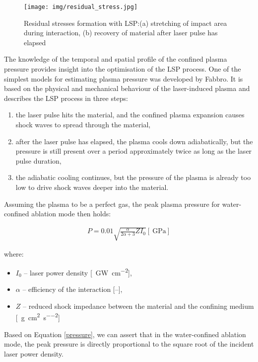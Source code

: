 \begin{figure}[h]
    \centering
    \texttt{[image: img/residual\_stress.jpg]}
    \caption{Residual stresses formation with LSP:(a) stretching of impact area during interaction, (b) recovery of material after laser pulse has elapsed \protect\cite{fabbro_peyre_berthe_scherpereel_1998}}
    \label{fig:lspresidual}
\end{figure}


The knowledge of the temporal and spatial profile of the confined plasma pressure provides insight into the optimisation of the LSP process. One of the simplest models for estimating plasma pressure was developed by Fabbro. It is based on the physical and mechanical behaviour of the laser-induced plasma and describes the LSP process in three steps:

\begin{enumerate}
    \item the laser pulse hits the material, and the confined plasma expansion causes shock waves to spread through the material,
    \item after the laser pulse has elapsed, the plasma cools down adiabatically, but the pressure is still present over a period approximately twice as long as the laser pulse duration,
    \item the adiabatic cooling continues, but the pressure of the plasma is already too low to drive shock waves deeper into the material.
\end{enumerate}

Assuming the plasma to be a perfect gas, the peak plasma pressure for water-confined ablation mode then holds:

\begin{gather} \label{pressure}
P = 0.01\sqrt{\frac{\alpha}{2\alpha + 3} Z I_{0} }  [\SI{}{\giga\pascal}] 
\end{gather} 

where:

\begin{itemize}
    \item $I_{0}$ -- laser power density [\SI{}{\giga\watt\per\cm\squared}],
    \item $\alpha$ -- efficiency of the interaction [--],
    \item $Z$ -- reduced shock impedance between the material and the confining medium [\SI{}{\gram\per\cm\squared\per\second\squared}]
\end{itemize}
    
Based on Equation \ref{pressure}, we can assert that in the water-confined ablation mode, the peak pressure is directly proportional to the square root of the incident laser power density.

